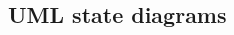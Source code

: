 \documentclass[12pt]{article}
\begin{document}
\begin{spacing}{1.5}

\newpage

\section{UML state diagrams}


\end{spacing}
\end{document}
